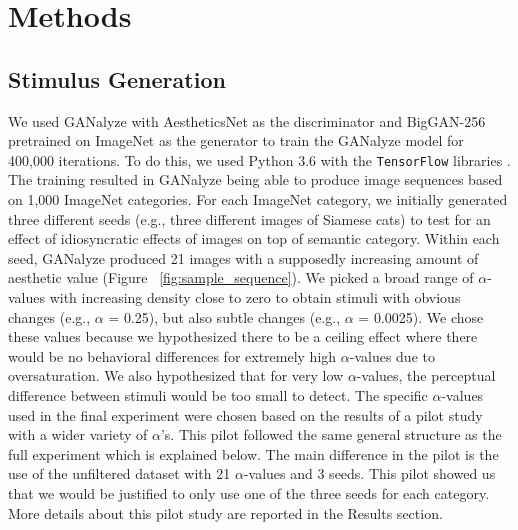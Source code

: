 \documentclass[../main.tex]{subfiles}
\begin{document}
\section{Methods}
\subsection{Stimulus Generation}
We used GANalyze with AestheticsNet \parencite{kongPhotoAestheticsRanking2016} as the discriminator and BigGAN-256 \parencite{brockLargeScaleGAN2019} pretrained on ImageNet \parencite{russakovskyImageNetLargeScale2015} as the generator to train the GANalyze model for 400,000 iterations. To do this, we used Python 3.6 with the \texttt{TensorFlow} libraries \parencite{abadi2016tensorflow}. The training resulted in GANalyze being able to produce image sequences based on 1,000 ImageNet categories. For each ImageNet category, we initially generated three different seeds (e.g., three different images of Siamese cats) to test for an effect of idiosyncratic effects of images on top of semantic category. Within each seed, GANalyze produced 21 images with a supposedly increasing amount of aesthetic value (Figure ~\ref{fig:sample_sequence}). We picked a broad range of $\alpha$-values with increasing density close to zero to obtain stimuli with obvious changes (e.g., $\alpha$ = 0.25), but also subtle changes (e.g., $\alpha$ = 0.0025). We chose these values because we hypothesized there to be a ceiling effect where there would be no behavioral differences for extremely high $\alpha$-values due to oversaturation. We also hypothesized that for very low $\alpha$-values, the perceptual difference between stimuli would be too small to detect. The specific $\alpha$-values used in the final experiment were chosen based on the results of a pilot study with a wider variety of $\alpha$'s. This pilot followed the same general structure as the full experiment which is explained below. The main difference in the pilot is the use of the unfiltered dataset with 21 $\alpha$-values and 3 seeds. This pilot showed us that we would be justified to only use one of the three seeds for each category. More details about this pilot study are reported in the Results section.
\end{document}
